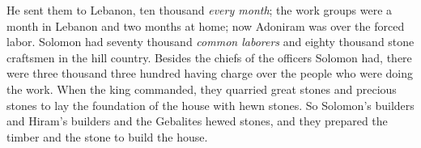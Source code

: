\begin{biblechapter}
\verse He sent them to Lebanon, ten thousand \textit{every month}; the work groups were a month in Lebanon and two months at home; now Adoniram was over the forced labor.
\verse Solomon had seventy thousand \textit{common laborers} and eighty thousand stone craftsmen in the hill country.
\verse Besides the chiefs of the officers Solomon had, there were three thousand three hundred having charge over the people who were doing the work.
\verse When the king commanded, they quarried great stones and precious stones to lay the foundation of the house with hewn stones.
\verse So Solomon’s builders and Hiram’s builders and the Gebalites hewed stones, and they prepared the timber and the stone to build the house.
\end{biblechapter}

